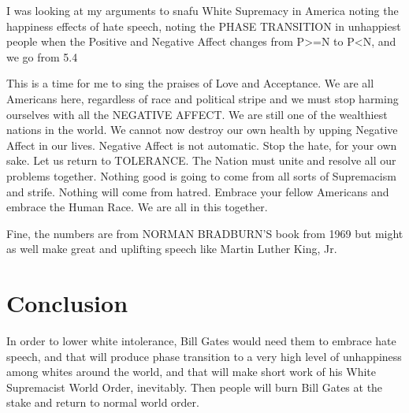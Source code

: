 \documentclass{amsart}
\begin{document}
I was looking at my arguments to snafu White Supremacy in America noting the happiness effects of hate speech, noting the PHASE TRANSITION in unhappiest people when the Positive and Negative Affect changes from P>=N to P<N, and we go from 5.4%

This is a time for me to sing the praises of Love and Acceptance.  We are all Americans here, regardless of race and political stripe and we must stop harming ourselves with all the NEGATIVE AFFECT.  We are still one of the wealthiest nations in the world.  We cannot now destroy our own health by upping Negative Affect in our lives.  Negative Affect is not automatic.  Stop the hate, for your own sake.  Let us return to TOLERANCE.  The Nation must unite and resolve all our problems together.  Nothing good is going to come from all sorts of Supremacism and strife.  Nothing will come from hatred.  Embrace your fellow Americans and embrace the Human Race.  We are all in this together.  

Fine, the numbers are from NORMAN BRADBURN'S book from 1969 but might as well make great and uplifting speech like Martin Luther King, Jr.  

\section{Conclusion}

In order to lower white intolerance, Bill Gates would need them to embrace hate speech, and that will produce phase transition to a very high level of unhappiness among whites around the world, and that will make short work of his White Supremacist World Order, inevitably.  Then people will burn Bill Gates at the stake and return to normal world order.
\end{document}

